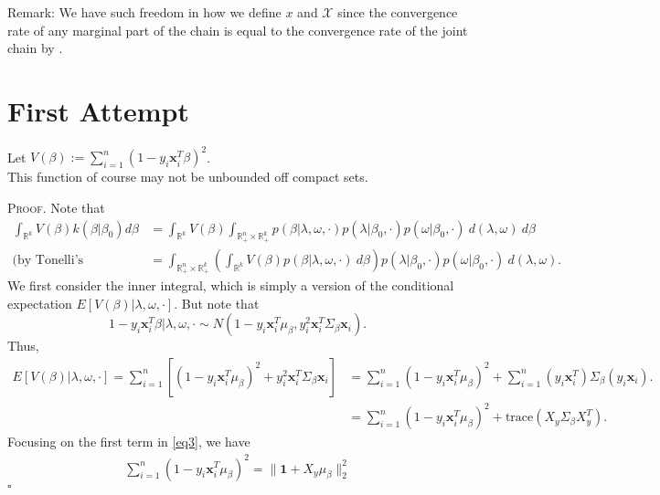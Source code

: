 \documentclass[12pt]{article}
\newcounter{ProofCounter}
\newenvironment{Proof}{\stepcounter{ProofCounter}\textsc{Proof.}}{\hfill$\square$}
\numberwithin{equation}{section}
\begin{document}
Remark: We have such freedom in how we define $x$ and $\mathcal{X}$ since the convergence rate of any marginal part of the chain is equal to the convergence rate
of the joint chain by \cite{jointvmarg}.

\newpage

\section{First Attempt}

Let $V(\beta) := \sum_{i=1}^{n}(1 - y_i\bm{x}_i^T\beta)^2$. \\

This function of course may not be unbounded off compact sets.

\begin{Proof}
  Note that 
  \begin{align}
    \int_{\mathbb{R}^{k}} V(\beta) k(\beta|\beta_0)d\beta & = \int_{\mathbb{R}^{k}}V(\beta) \int_{\mathbb{R}^{n}_+\times \mathbb{R}^{k}_+}
    p(\beta|\lambda,\omega, \cdot)p(\lambda|\beta_0, \cdot)p(\omega|\beta_0, \cdot)\ d(\lambda, \omega)\ d\beta \nonumber \\
    \text{(by Tonelli's Theorem)} \ & = \int_{\mathbb{R}^{n}_+\times\mathbb{R}^{k}_+} \left( \int_{\mathbb{R}^{k}} V(\beta)p(\beta|\lambda, \omega,
    \cdot)\ d\beta \right) p(\lambda|\beta_0,\cdot)p(\omega|\beta_0, \cdot)\ d(\lambda, \omega).
    \label{eq0}
  \end{align}
  We first consider the inner integral, which is simply a version of the conditional expectation $E[V(\beta)|\lambda,\omega,\cdot]$.
  But note that 
  \begin{equation*}
    1 - y_i\bm{x}_i^T\beta | \lambda, \omega, \cdot \sim N\left( 1 - y_i\bm{x}_i^T\mu_{\beta}, y_i^2 \bm{x}_i^T \Sigma_{\beta}\bm{x}_i\right).
    \label{eq2}
  \end{equation*}
  Thus,
  \begin{align}
    E[V(\beta)|\lambda,\omega,\cdot] = \sum_{i=1}^{n}\left[(1 - y_i\bm{x}_i^T\mu_{\beta})^2 + y_i^2 \bm{x}_i^T \Sigma_{\beta} \bm{x}_i\right] & = \sum_{i=1}^{n}
    (1 - y_i\bm{x}_i^T\mu_{\beta})^2 + \sum_{i=1}^{n}(y_i\bm{x}_i^T)\Sigma_{\beta}(y_i \bm{x}_i). \nonumber \\
    & = \sum_{i=1}^{n} (1 - y_i\bm{x}_i^T\mu_{\beta})^2 + \text{trace}(X_{y} \Sigma_{\beta} X_{y}^T).
    \label{eq3}
  \end{align}
  Focusing on the first term in \eqref{eq3}, we have 
  \begin{align}
    \sum_{i=1}^{n}(1 - y_i \bm{x}_i^T \mu_{\beta})^2 = \|\mathbf{1} + X_{y}\mu_{\beta}\|_{2}^{2} 

\end{align}
\end{Proof}
\end{document}
